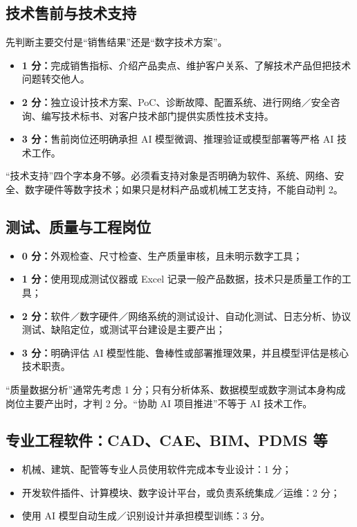 \documentclass[11pt,a4paper,fontset=none]{ctexart}
\begin{document}
\subsection{技术售前与技术支持}

先判断主要交付是“销售结果”还是“数字技术方案”。

\begin{itemize}
  \item \textbf{1 分：}完成销售指标、介绍产品卖点、维护客户关系、了解技术产品但把技术问题转交他人。
  \item \textbf{2 分：}独立设计技术方案、PoC、诊断故障、配置系统、进行网络／安全咨询、编写技术标书、对客户技术部门提供实质性技术支持。
  \item \textbf{3 分：}售前岗位还明确承担 AI 模型微调、推理验证或模型部署等严格 AI 技术工作。
\end{itemize}

“技术支持”四个字本身不够。必须看支持对象是否明确为软件、系统、网络、安全、数字硬件等数字技术；如果只是材料产品或机械工艺支持，不能自动判 2。

\subsection{测试、质量与工程岗位}

\begin{itemize}
  \item \textbf{0 分：}外观检查、尺寸检查、生产质量审核，且未明示数字工具；
  \item \textbf{1 分：}使用现成测试仪器或 Excel 记录一般产品数据，技术只是质量工作的工具；
  \item \textbf{2 分：}软件／数字硬件／网络系统的测试设计、自动化测试、日志分析、协议测试、缺陷定位，或测试平台建设是主要产出；
  \item \textbf{3 分：}明确评估 AI 模型性能、鲁棒性或部署推理效果，并且模型评估是核心技术职责。
\end{itemize}

“质量数据分析”通常先考虑 1 分；只有分析体系、数据模型或数字测试本身构成岗位主要产出时，才判 2 分。“协助 AI 项目推进”不等于 AI 技术工作。

\subsection{专业工程软件：CAD、CAE、BIM、PDMS 等}

\begin{itemize}
  \item 机械、建筑、配管等专业人员使用软件完成本专业设计：1 分；
  \item 开发软件插件、计算模块、数字设计平台，或负责系统集成／运维：2 分；
  \item 使用 AI 模型自动生成／识别设计并承担模型训练：3 分。
\end{itemize}
\end{document}

